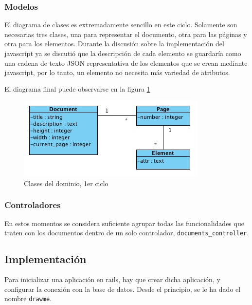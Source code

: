 \subsubsection{Modelos} %
\label{ssub:modelos}

El diagrama de clases es extremadamente sencillo en este ciclo. Solamente son necesarias tres clases, una para representar el documento, otra para las páginas y otra para los elementos. Durante la discusión sobre la implementación del javascript ya se discutió que la descripción de cada elemento se guardaría como una cadena de texto JSON representativa de los elementos que se crean mediante javascript, por lo tanto, un elemento no necesita más variedad de atributos.

El diagrama final puede observarse en la figura \ref{fig:uml1}

\begin{figure}[h!]
\centering
\includegraphics{uml1.png}
\caption{Clases del dominio, 1er ciclo}\label{fig:uml1}
\end{figure}



\subsubsection{Controladores} %
\label{ssub:controladores}

En estos momentos se considera suficiente agrupar todas las funcionalidades que traten con los documentos dentro de un solo controlador, \texttt{documents\_controller}. 



\subsection{Implementación} %
\label{sub:implementacion}

Para inicializar una aplicación en rails, hay que crear dicha aplicación, y configurar la conexión con la base de datos. Desde el principio, se le ha dado el nombre \texttt{drawme}. 

